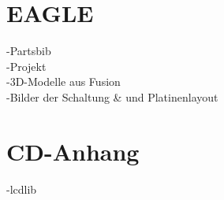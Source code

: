 
\newpage
\appendix
\section{EAGLE}
\label{ap-test}
-Partsbib\\
-Projekt\\
-3D-Modelle aus Fusion\\
-Bilder der Schaltung \& und Platinenlayout\\
\section{CD-Anhang}
-lcdlib\\
